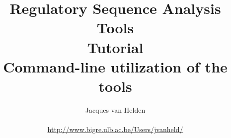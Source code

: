 \documentclass{book}
\begin{document}
\title{Regulatory Sequence Analysis Tools \\
Tutorial \\
Command-line utilization of the tools}

\author{
	Jacques van Helden \\
	 \\
	\url{http://www.bigre.ulb.ac.be/Users/jvanheld/} \\
	\bigre 
}

\maketitle

\newpage
\tableofcontents
\newpage

\newpage


\newpage


\newpage


\newpage


\newpage


\newpage


\newpage


\newpage


\newpage


\newpage


\newpage


\newpage


\newpage


\newpage


\newpage


\newpage




% 

% 

\newpage


\newpage


\newpage


\newpage

\end{document}

